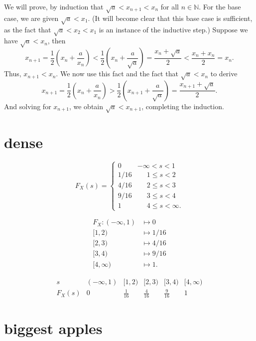 \documentclass[12pt]{article}
\newcommand{\N}{\mathbb{N}}
\begin{document}
    We will prove, by induction that $\sqrt{a} < x_{n + 1} < x_n$ for all $n \in \N$. For the base case, we are given $\sqrt{a} < x_1$. (It will become clear that this base case is sufficient, as the fact that $\sqrt{a} < x_2 < x_1$ is an instance of the inductive step.) Suppose we have $\sqrt{a} < x_n$, then
    \[
        x_{n + 1} = \frac{1}{2} \left( x_n + \frac{a}{x_n} \right) < \frac{1}{2} \left( x_n + \frac{a}{\sqrt{a}} \right) = \frac{x_n + \sqrt{a}}{2} < \frac{x_n + x_n}{2} = x_n.
    \]
    Thus, $x_{n + 1} < x_n$. We now use this fact and the fact that $\sqrt{a} < x_n$ to derive
    \[
        x_{n + 1} = \frac{1}{2} \left( x_n + \frac{a}{x_n} \right) > \frac{1}{2} \left( x_{n + 1} + \frac{a}{\sqrt{a}} \right) = \frac{x_{n + 1} + \sqrt{a}}{2}.
    \]
    And solving for $x_{n + 1}$, we obtain $\sqrt{a} < x_{n + 1}$, completing the induction.


\section{dense}

\[
    F_X(s) = \begin{cases}
        0 & -\infty < s < 1 \\
        1/16 & \phantom{-x}1 \leq s < 2 \\
        4/16 & \phantom{-x}2 \leq s < 3 \\
        9/16 & \phantom{-x}3 \leq s < 4 \\
        1 & \phantom{-x}4 \leq s < \infty.
    \end{cases}
\]

\begin{align*}
    F_X : (-\infty, 1) &\mapsto 0 \\
    [1, 2) &\mapsto 1/16 \\
    [2, 3) &\mapsto 4/16 \\
    [3, 4) &\mapsto 9/16 \\
    [4, \infty) &\mapsto 1.
\end{align*}

\[\begin{array}{c||c|c|c|c|c}
    s & (-\infty, 1) & [1, 2) & [2, 3) & [3, 4) & [4, \infty) \\
    \hline
    F_X(s) & 0 & \frac{1}{16} & \frac{4}{16} & \frac{9}{16} & 1
\end{array}\]

\section{biggest apples}
\end{document}
